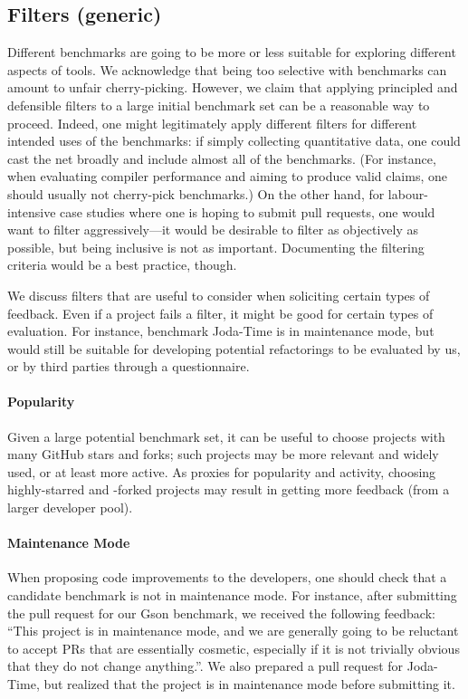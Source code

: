\subsection{Filters (generic)}
Different benchmarks are going to be more or less suitable for exploring different aspects of tools. We acknowledge that being too selective with benchmarks can amount to unfair cherry-picking. However, we claim that applying principled and defensible filters to a large initial benchmark set can be a reasonable way to proceed. Indeed, one might legitimately apply different filters for different intended uses of the benchmarks: if simply collecting quantitative data, one could cast the net broadly and include almost all of the benchmarks. (For instance, when evaluating compiler performance and aiming to produce valid claims, one should usually not cherry-pick benchmarks.) On the other hand, for labour-intensive case studies where one is hoping to submit pull requests, one would want to filter aggressively---it would be desirable to filter as objectively as possible, but being inclusive is not as important. Documenting the filtering criteria would be a best practice, though.

We discuss filters that are useful to consider when soliciting certain types of feedback. Even if a project fails a filter, it might be good for certain types of evaluation. For instance, benchmark Joda-Time is in maintenance mode, but would still be suitable for developing potential refactorings to be evaluated by us, or by third parties through a questionnaire.

\paragraph{Popularity}
Given a large potential benchmark set, it can be useful to choose projects with many GitHub stars and forks; such projects may be more relevant and widely used, or at least more active. As proxies for popularity and activity, choosing highly-starred and -forked projects may result in getting more feedback (from a larger developer pool).

\paragraph{Maintenance Mode}
When proposing code improvements to the developers, one should check that a candidate benchmark is not in maintenance mode. For instance, after submitting the pull request for our Gson benchmark, we received the following feedback: ``This project is in maintenance mode, and we are generally going to be reluctant to accept PRs that are essentially cosmetic, especially if it is not trivially obvious that they do not change anything.''. We also prepared a pull request for Joda-Time, but realized that the project is in maintenance mode before submitting it.

